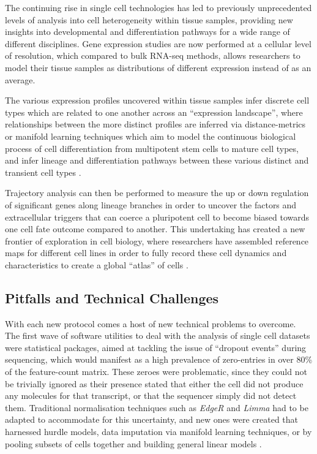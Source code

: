 \documentclass[a4paper,num-refs]{oup-contemporary}
\newcommand{\prog}[1]{\textit{#1}}
\begin{document}
The continuing rise in single cell technologies has led to previously unprecedented levels of analysis into cell heterogeneity within tissue samples, providing new insights into developmental and differentiation pathways for a wide range of different disciplines. Gene expression studies are now performed at a cellular level of resolution, which compared to bulk RNA-seq methods, allows researchers to model their tissue samples as distributions of different expression instead of as an average.

The various expression profiles uncovered within tissue samples infer discrete cell types which are related to one another across an ``expression landscape'', where relationships between the more distinct profiles are inferred via distance-metrics or manifold learning techniques which aim to model the continuous biological process of cell differentiation from multipotent stem cells to mature cell types, and infer lineage and differentiation pathways between these various distinct and transient cell types \cite{wagner2016revealing}.

Trajectory analysis can then be performed to measure the up or down regulation of significant genes along lineage branches in order to uncover the factors and extracellular triggers that can coerce a pluripotent cell to become biased towards one cell fate outcome compared to another. This undertaking has created a new frontier of exploration in cell biology, where researchers have assembled reference maps for different cell lines in order to fully record these cell dynamics and characteristics to create a global ``atlas'' of cells \citep{rozenblatt2017human}.

\subsection{Pitfalls and Technical Challenges}
With each new protocol comes a host of new technical problems to overcome. The first wave of software utilities to deal with the analysis of single cell datasets were statistical packages, aimed at tackling the issue of ``dropout events'' during sequencing, which would manifest as a high prevalence of zero-entries in over 80\% of the feature-count matrix. These zeroes were problematic, since they could not be trivially ignored as their presence stated that either the cell did not produce any molecules for that transcript, or that the sequencer simply did not detect them. Traditional normalisation techniques such as \prog{EdgeR} and \prog{Limma} had to be adapted to accommodate for this uncertainty, and new ones were created that harnessed hurdle models, data imputation via manifold learning techniques, or by pooling subsets of cells together and building general linear models \citep{camara2018methods}.
\end{document}
